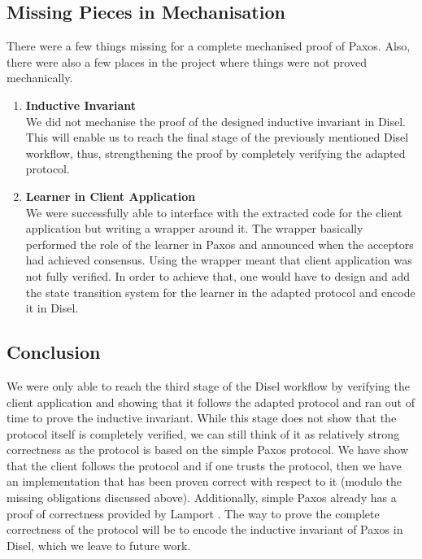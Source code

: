 \vspace{-5mm}
\subsection{Missing Pieces in Mechanisation}
There were a few things missing for a complete mechanised proof of Paxos.
Also, there were also a few places in the project where things
were not proved mechanically.

\begin{enumerate}
  \item \textbf{Inductive Invariant} \\
    We did not mechanise the proof of the designed inductive invariant in Disel.
    This will enable us to reach the final stage of the previously mentioned Disel workflow,
    thus, strengthening the proof by completely verifying the adapted protocol.
  \item \textbf{Learner in Client Application} \\
    We were successfully able to interface with the extracted code for the client
    application but writing a wrapper around it. The wrapper basically performed
    the role of the learner in Paxos and announced when the acceptors had
    achieved consensus. Using the wrapper meant that client application was not
    fully verified. In order to achieve that, one would have to design and add the
    state transition system for the learner in the adapted protocol and encode it
    in Disel.
\end{enumerate}

\vspace{-5mm}
\subsection{Conclusion}
We were only able to reach the third stage of the Disel workflow by
verifying the client application and showing that it follows the
adapted protocol and ran out of time to prove the inductive invariant.
While this stage does not show that the protocol itself
is completely verified, we can still think of it as relatively strong
correctness as the protocol is based on the simple Paxos protocol.
We have show that the client follows the protocol and
if one trusts the protocol, then we have an implementation that has been proven correct
with respect to it (modulo the missing obligations discussed above).
Additionally, simple Paxos already has a proof of correctness provided by Lamport \cite{4}.
The way to prove the complete correctness of the protocol will be to encode the
inductive invariant of Paxos in Disel, which we leave to future work.

